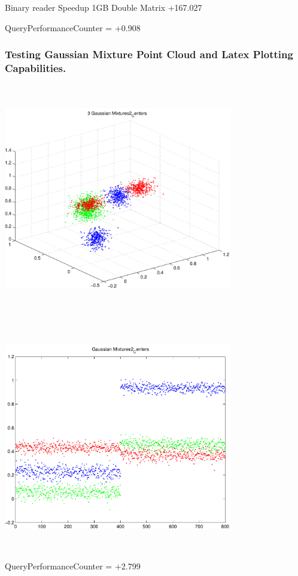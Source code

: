 \documentclass[9pt]{article}
\theoremstyle{plain}
\theoremstyle{definition}
\theoremstyle{remark}
\numberwithin{equation}{section}
\begin{document}
Binary reader Speedup 1GB Double Matrix +167.027

QueryPerformanceCounter  =  +0.908
\subsubsection{Testing Gaussian Mixture Point Cloud and Latex Plotting Capabilities.}
\includegraphics[width=10.0cm,height=10.0cm]{GaussianMixture_Dim_3_Centers2.pdf}

\includegraphics[width=10.0cm,height=10.0cm]{GaussianMixture_Dim_1_Centers2.pdf}

QueryPerformanceCounter  =  +2.799
\end{document}
